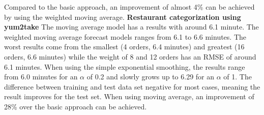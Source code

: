 Compared to the basic approach, an improvement of almost 4\% can be achieved by using the weighted moving average.
\newline\newline\textbf{Restaurant categorization using yum2take}\newline
 The moving average model has a results with around 6.1 minute. The weighted moving average forecast models ranges from 6.1 to 6.6 minutes. The worst results come from the smallest (4 orders, 6.4 minutes) and greatest (16 orders, 6.6 minutes) while the weight of 8 and 12 orders has an RMSE of around 6.1 minutes. When using the simple exponential smoothing, the results range from 6.0 minutes for an $\alpha$ of 0.2 and slowly grows up to 6.29 for an $\alpha$ of 1. The difference between training and test data set negative for most cases, meaning the result improves for the test set.\newline
 When using moving average, an improvement of 28\% over the basic approach can be achieved.
